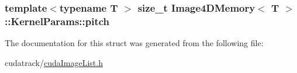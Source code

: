 \subsubsection[{\texorpdfstring{pitch}{pitch}}]{\setlength{\rightskip}{0pt plus 5cm}template$<$typename T $>$ size\+\_\+t {\bf Image4\+D\+Memory}$<$ T $>$\+::Kernel\+Params\+::pitch}\hypertarget{struct_image4_d_memory_1_1_kernel_params_a9ec3499adf40c6b9538dbd81149dc3ea}{}\label{struct_image4_d_memory_1_1_kernel_params_a9ec3499adf40c6b9538dbd81149dc3ea}


The documentation for this struct was generated from the following file\+:\begin{DoxyCompactItemize}
\item 
cudatrack/\hyperlink{cuda_image_list_8h}{cuda\+Image\+List.\+h}\end{DoxyCompactItemize}
